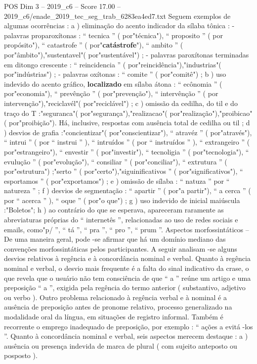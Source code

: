 \begin{textsample}{POS Dim 3 – 2019\_c6 – Score 17.00 – 2019\_c6/enade\_2019\_tec\_seg\_trab\_6283ea4ed7.txt}
Seguem exemplos de algumas ocorrências : a ) eliminação do acento indicador da sílaba tônica : - palavras proparoxítonas : “ tecnica ” ( por"técnica"), “ proposito ” ( por propósito"), “ catastrofe ” ( por"\textbf{catástrofe}"), “ ambito ” ( por"âmbito"),"sustentavel"( por"sustentável") ; - palavras paroxítonas terminadas em ditongo crescente : “ reincidencia ” ( por"reincidência"),"industrias"( por"indústrias") ; - palavras oxítonas : “ comite ” ( por"comitê") ; b ) uso indevido do acento gráfico, \textbf{localizado} em sílaba átona : “ ecônomia ” ( por"economia"), “ prevênção ” ( por"prevenção"), “ intervênção ” ( por intervenção"),"reciclavél"( por"reciclável") ; c ) omissão da cedilha, do til e do traço do T :"seguranca"( por"segurança"),"realizacao"( por"realização"),"proibicao"( por"proibição").
Há, inclusive, respostas com ausência total de cedilha ou til ; d ) desvios de grafia :"concientizar"( por"conscientizar"), “ atravéz ” ( por"através"), “ intrui ” ( por “ instrui ” ), “ intruídos ” ( por “ instruídos ” ), “ extrangeiro ” ( por"estrangeiro"), “ envestir ” ( por"investir"), “ tecnoligia ” ( por"tecnologia"), “ evulução ” ( por"evolução"), “ consiliar ” ( por"conciliar"), “ extrutura ” ( por"estrutura") ;"serto ” ( por"certo"),"siguinificativos ” ( por"significativos"), “ esportamos ” ( por"exportamos") ; e ) omissão de sílaba : “ natuza ” por “ natureza ” ; f ) desvios de segmentação : “ apartir ” ( por"a partir"), “ a cerca ” ( por “ acerca ” ), “ oque ” ( por"o que") ; g ) uso indevido de inicial maiúscula :"Boletos"; h ) ao contrário do que se esperava, apareceram raramente as abreviaturas próprias do “ internetês ”, relacionadas ao uso de redes sociais e emails, como"p/ ”, “ tá ”, “ pra ”, “ pro ”, “ prum ”.
Aspectos morfossintáticos – De uma maneira geral, pode -se afirmar que há um domínio mediano das convenções morfossintáticas pelos participantes.
A seguir analisam -se alguns desvios relativos à regência e à concordância nominal e verbal.
Quanto à regência nominal e verbal, o desvio mais frequente é a falta do sinal indicativo da crase, o que revela que o usuário não tem consciência de que “ a ” reúne um artigo e uma preposição “ a ”, exigida pela regência do termo anterior ( substantivo, adjetivo ou verbo ).
Outro problema relacionado à regência verbal e à nominal é a ausência de preposição antes de pronome relativo, processo generalizado na modalidade oral da língua, em situações de registro informal.
Também é recorrente o emprego inadequado de preposição, por exemplo : “ ações a evitá -los ”.
Quanto à concordância nominal e verbal, seis aspectos merecem destaque : a ) ausência ou presença indevida de marca de plural ( com sujeito anteposto ou posposto ).

\end{textsample}
